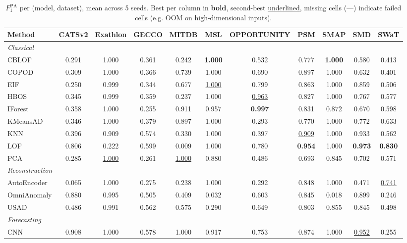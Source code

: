 \begin{table}[t]
\centering
\small
\caption{$F_1^{\text{PA}}$ per (model, dataset), mean across 5 seeds. Best per column in \textbf{bold}, second-best \underline{underlined}, missing cells (---) indicate failed cells (e.g. OOM on high-dimensional inputs).}
\label{tab:by-dataset-pa-f1}
\begin{tabular}{lcccccccccc}
\toprule
Method & CATSv2 & Exathlon & GECCO & MITDB & MSL & OPPORTUNITY & PSM & SMAP & SMD & SWaT \\
\midrule
\multicolumn{11}{l}{\textit{Classical}} \\
CBLOF & 0.291 & 1.000 & 0.361 & 0.242 & \textbf{1.000} & 0.532 & 0.777 & \textbf{1.000} & 0.580 & 0.413 \\
COPOD & 0.309 & 1.000 & 0.366 & 0.739 & 1.000 & 0.690 & 0.897 & 1.000 & 0.632 & 0.401 \\
EIF & 0.250 & 0.999 & 0.344 & 0.677 & \underline{1.000} & 0.799 & 0.863 & 1.000 & 0.859 & 0.506 \\
HBOS & 0.345 & 0.999 & 0.359 & 0.237 & 1.000 & \underline{0.963} & 0.827 & 1.000 & 0.767 & 0.577 \\
IForest & 0.358 & 1.000 & 0.255 & 0.911 & 0.957 & \textbf{0.997} & 0.831 & 0.872 & 0.670 & 0.598 \\
KMeansAD & 0.346 & 1.000 & 0.379 & 0.897 & 1.000 & 0.293 & 0.770 & 1.000 & 0.772 & 0.633 \\
KNN & 0.396 & 0.909 & 0.574 & 0.330 & 1.000 & 0.397 & \underline{0.909} & 1.000 & 0.933 & 0.562 \\
LOF & 0.806 & 0.222 & 0.599 & 0.009 & 1.000 & 0.780 & \textbf{0.954} & 1.000 & \textbf{0.973} & \textbf{0.830} \\
PCA & 0.285 & \underline{1.000} & 0.261 & \underline{1.000} & 0.880 & 0.486 & 0.693 & 0.845 & 0.702 & 0.571 \\
\midrule
\multicolumn{11}{l}{\textit{Reconstruction}} \\
AutoEncoder & 0.065 & 1.000 & 0.275 & 0.238 & 1.000 & 0.292 & 0.848 & 1.000 & 0.471 & \underline{0.741} \\
OmniAnomaly & 0.880 & 0.995 & 0.505 & 0.409 & 0.032 & 0.603 & 0.845 & 0.018 & 0.899 & 0.246 \\
USAD & 0.486 & 0.991 & 0.562 & 0.575 & 0.290 & 0.649 & 0.803 & 0.855 & 0.845 & 0.498 \\
\midrule
\multicolumn{11}{l}{\textit{Forecasting}} \\
CNN & 0.908 & 1.000 & 0.578 & 1.000 & 0.917 & 0.753 & 0.874 & 1.000 & \underline{0.952} & 0.255 \\

\end{tabular}
\end{table}
